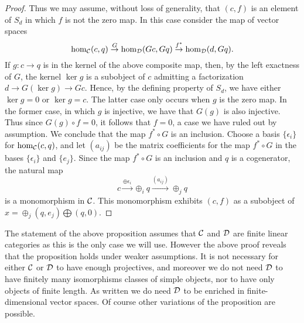 \documentclass{amsart}
\begin{document}
\begin{proof}
Thus we may assume, without loss of generality, that  $(c, f)$ is an element of $S_d$ in which $f$ is not the zero map. In this case consider the map of vector spaces
\begin{equation*}
	\hom_{\mathcal C}(c,q) \stackrel{G}{\to} \hom_{\mathcal D}(G c, G q) \stackrel{f^*}{\to} \hom_{\mathcal D}(d, G q).
\end{equation*} 
If $g: c \to q$ is in the kernel of the above composite map, then, by the left exactness of $G$, the kernel $\ker g$ is a subobject of $c$ admitting a factorization $d \to G(\ker g) \to G c$. Hence, by the defining property of $S_d$, we have either $\ker g = 0$ or $\ker g = c$. The latter case only occurs when $g$ is the zero map. In the former case, in which $g$ is injective, we have that $G(g)$ is also injective. Thus since $G(g) \circ f = 0$, it follows that $f = 0$, a case we have ruled out by assumption. We conclude that the map $f^* \circ G$ is an inclusion. Choose a basis  $\{ \epsilon_i \}$ for $\hom_{\mathcal C}(c,q)$, and let $(a_{ij})$ be the matrix coefficients for the map $f^* \circ G$ in the bases $\{ \epsilon_i \}$ and $\{ e_j \}$. Since the map $f^* \circ G$ is an inclusion and $q$ is a cogenerator, the natural map
\begin{equation*}
	c \stackrel{\oplus \epsilon_i}{\to} \oplus_i q \stackrel{(a_{ij}) }{\to} \oplus_j q
\end{equation*} 
is a monomorphism in $\mathcal C$. This monomorphism exhibits $(c,f)$ as a subobject of $x = \oplus_j( q, e_j) \bigoplus (q,0)$. 
\end{proof}

\begin{remark}
	The statement of the above proposition assumes that $\mathcal C$ and $\mathcal D$ are finite linear categories as this is the only case we will use. However the above proof reveals that the proposition holds under weaker assumptions. It is not necessary for either $\mathcal C$ or $\mathcal D$ to have enough projectives, and moreover we do not need $\mathcal D$ to have finitely many isomorphisms classes of simple objects, nor to have only objects of finite length. As written we do need $\mathcal D$ to be enriched in finite-dimensional vector spaces. Of course other variations of the proposition are possible. 
\end{remark}
\end{document}
